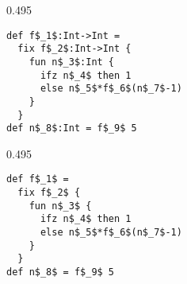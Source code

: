 \begin{figure}
\begin{boxedminipage}{0.495\hsize}
\begin{lstlisting}[language=LMR,basicstyle=\lstfigurestyle,breaklines=true,frame=none]
def f$_1$:Int->Int =
  fix f$_2$:Int->Int {
    fun n$_3$:Int {
      ifz n$_4$ then 1
      else n$_5$*f$_6$(n$_7$-1)
    }
  }
def n$_8$:Int = f$_9$ 5
\end{lstlisting}
\end{boxedminipage}\hfill
\begin{boxedminipage}{0.495\hsize}
\begin{lstlisting}[language=LMR,basicstyle=\lstfigurestyle,breaklines=true,frame=none]
def f$_1$ =
  fix f$_2$ {
    fun n$_3$ {
      ifz n$_4$ then 1
      else n$_5$*f$_6$(n$_7$-1)
    }
  }
def n$_8$ = f$_9$ 5
\end{lstlisting}
\end{boxedminipage}


\end{figure}
